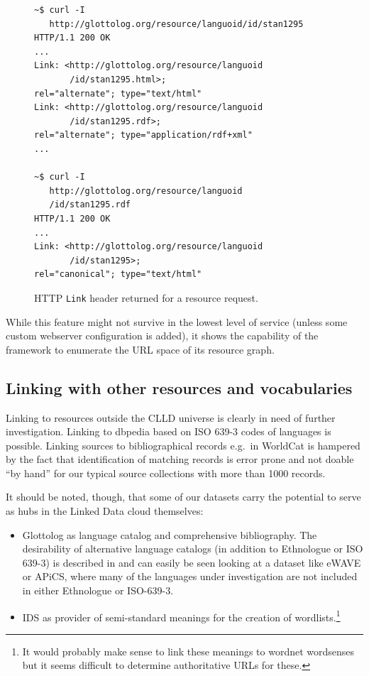 \documentclass[a4paper,10pt]{article}
\begin{document}
\begin{figure}
\label{fig:linkheader}
\caption{HTTP \texttt{Link} header returned for a resource request.}
{\scriptsize
\begin{verbatim}
~$ curl -I 
   http://glottolog.org/resource/languoid/id/stan1295
HTTP/1.1 200 OK
...
Link: <http://glottolog.org/resource/languoid
       /id/stan1295.html>; 
rel="alternate"; type="text/html"
Link: <http://glottolog.org/resource/languoid
       /id/stan1295.rdf>; 
rel="alternate"; type="application/rdf+xml"
...

~$ curl -I 
   http://glottolog.org/resource/languoid
   /id/stan1295.rdf
HTTP/1.1 200 OK
...
Link: <http://glottolog.org/resource/languoid
       /id/stan1295>; 
rel="canonical"; type="text/html"
\end{verbatim}
}
\end{figure}

While this feature might not survive in the lowest level of service (unless some custom webserver configuration is added), 
it shows the capability of the framework to enumerate the URL space of its resource graph.


\subsection{Linking with other resources and vocabularies}

Linking to resources outside the CLLD universe is clearly in need of further investigation. Linking to dbpedia based on ISO 639-3 codes of languages is possible.
Linking sources to bibliographical records e.g.~in WorldCat is hampered by the fact that identification of matching records is error prone and not doable ``by hand'' for our typical source collections with more than 1000 records.

It should be noted, though, that some of our datasets carry the potential to serve as hubs in the Linked Data cloud themselves:
\begin{itemize}
\item Glottolog as language catalog and comprehensive bibliography. The desirability of alternative language catalogs (in addition to Ethnologue or ISO 639-3) is described in
 and can easily be seen looking at a dataset like eWAVE or APiCS, where many of the languages under investigation are not included in either Ethnologue or ISO-639-3.
\item IDS as provider of semi-standard meanings for the creation of wordlists.\footnote{It would probably make sense to link these meanings to wordnet wordsenses but it seems difficult to determine authoritative URLs for these.}
\end{itemize}
\end{document}
